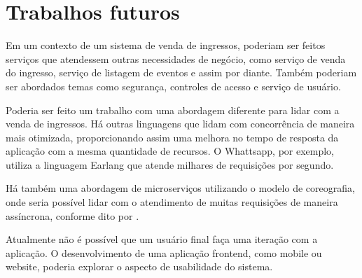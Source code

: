 \chapter{Trabalhos futuros}\label{trabalhos-futuros}

Em um contexto de um sistema de venda de ingressos, poderiam ser feitos serviços que atendessem
outras necessidades de negócio, como serviço de venda do ingresso, serviço de listagem de eventos
e assim por diante.
Também poderiam ser abordados temas como segurança, controles de acesso e serviço de usuário.

Poderia ser feito um trabalho com uma abordagem diferente para lidar com a venda de ingressos.
Há outras linguagens que lidam com concorrência de maneira mais otimizada,
proporcionando assim uma melhora no tempo de resposta da aplicação com a mesma quantidade
de recursos.
O Whattsapp, por exemplo, utiliza a linguagem Earlang  que
atende milhares de requisições por segundo.

Há também uma abordagem de microserviços utilizando o modelo de coreografia, onde seria possível
lidar com o atendimento de muitas requisições de maneira assíncrona, conforme dito por
\cite{scaling-microservices-event-stream}.

Atualmente não é possível que um usuário final faça uma iteração com a aplicação. O desenvolvimento
de uma aplicação frontend, como mobile ou website, poderia explorar o aspecto de usabilidade
do sistema.
